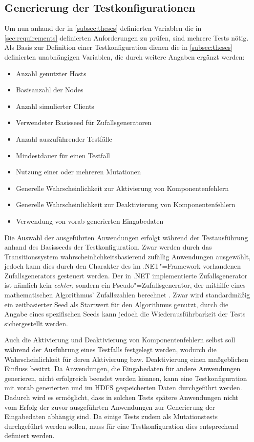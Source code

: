 \subsection{Generierung der Testkonfigurationen}
\label{subsec:testcaseGeneration}

Um nun anhand der in \cref{subsec:theses} definierten Variablen die in \cref{sec:requirements} definierten Anforderungen zu prüfen, sind mehrere Tests nötig.
Als Basis zur Definition einer Testkonfiguration dienen die in \cref{subsec:theses} definierten unabhängigen Variablen, die durch weitere Angaben ergänzt werden:

\begin{itemize}
    \item Anzahl genutzter Hosts
    \item Basisanzahl der Nodes
    \item Anzahl simulierter Clients
    \item Verwendeter Basisseed für Zufallsgeneratoren
    \item Anzahl auszuführender Testfälle
    \item Mindestdauer für einen Testfall
    \item Nutzung einer oder mehreren Mutationen
    \item Generelle Wahrscheinlichkeit zur Aktivierung von Komponentenfehlern
    \item Generelle Wahrscheinlichkeit zur Deaktivierung von Komponentenfehlern
    \item Verwendung von vorab generierten Eingabedaten
\end{itemize}

Die Auswahl der ausgeführten Anwendungen erfolgt während der Testausführung anhand des Basisseeds der Testkonfiguration.
Zwar werden durch das Transitionssystem wahrscheinlichkeitsbasierend zufällig Anwendungen ausgewählt, jedoch kann dies durch den Charakter des im .NET"=Framework vorhandenen Zufallsgenerators gesteuert werden.
Der in .NET implementierte Zufallsgenerator ist nämlich kein \emph{echter}, sondern ein Pseudo"=Zufallsgenerator, der mithilfe eines mathematischen Algorithmus' Zufallszahlen berechnet \cite{RandomClassDoc}.
Zwar wird standardmäßig ein zeitbasierter Seed als Startwert für den Algorithmus genutzt, durch die Angabe eines spezifischen Seeds kann jedoch die Wiederausführbarkeit der Tests sichergestellt werden.

Auch die Aktivierung und Deaktivierung von Komponentenfehlern selbst soll während der Ausführung eines Testfalls festgelegt werden, wodurch die Wahrscheinlichkeit für deren Aktivierung bzw. Deaktivierung einen maßgeblichen Einfluss besitzt.
Da Anwendungen, die Eingabedaten für andere Anwendungen generieren, \uU nicht erfolgreich beendet werden können, kann eine Testkonfiguration mit vorab generierten und im \ac{HDFS} gespeicherten Daten durchgeführt werden.
Dadurch wird es ermöglicht, dass in solchen Tests spätere Anwendungen nicht vom Erfolg der zuvor ausgeführten Anwendungen zur Generierung der Eingabedaten abhängig sind.
Da einige Tests zudem als Mutationstests durchgeführt werden sollen, muss für eine Testkonfiguration dies entsprechend definiert werden.

